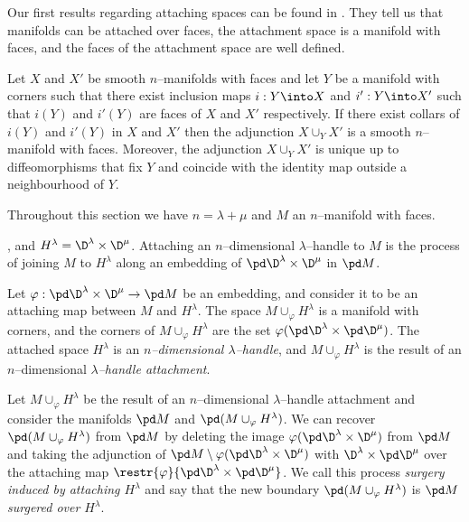 Our first results regarding attaching spaces can be found in \cite{JSP}.
They tell us that manifolds can be attached over faces, the attachment space is a manifold with faces, and the faces of the attachment space are well defined.

\begin{prop}
	Let $X$ and $X'$ be smooth $n$--manifolds with faces and let $Y$ be a manifold with corners such that there exist inclusion maps $i:Y\into X$ and $i':Y\into X'$ such that $i(Y)$ and $i'(Y)$ are faces of $X$ and $X'$ respectively.
	If there exist collars of $i(Y)$ and $i'(Y)$ in $X$ and $X'$ then the adjunction $X\cup_Y X'$ is a smooth $n$--manifold with faces.
	Moreover, the adjunction $X\cup_Y X'$ is unique up to diffeomorphisms that fix $Y$ and coincide with the identity map outside a neighbourhood of $Y$.
\end{prop}

Throughout this section we have $n=\lambda+\mu$ and $M$ an $n$--manifold with faces.




, and $H^\lambda=\D^\lambda\times\D^\mu$.
Attaching an $n$--dimensional $\lambda$--handle to $M$ is the process of joining $M$ to $H^\lambda$ along an embedding of $\pd\D^\lambda\times\D^\mu$ in $\pd M$. 

\begin{defn}[Handle]
	\label{def:handle}
	Let $\varphi:\pd\D^\lambda\times\D^\mu\to\pd M$ be an embedding, and consider it to be an attaching map between $M$ and $H^\lambda$.
	The space $M\cup_\varphi H^\lambda$ is a manifold with corners, and the corners of $M\cup_\varphi H^\lambda$ are the set $\varphi(\pd\D^\lambda\times\pd\D^\mu)$.
	The attached space $H^\lambda$ is an \emph{$n$--dimensional $\lambda$--handle}, and $M\cup_\varphi H^\lambda$ is the result of an $n$--dimensional \emph{$\lambda$--handle attachment}.
\end{defn}

\begin{defn}[Surgery]
	\label{def:surgery}
	Let $M\cup_\varphi H^\lambda$ be the result of an $n$--dimensional $\lambda$--handle attachment and consider the manifolds $\pd M$ and $\pd (M\cup_\varphi H^\lambda)$.
	We can recover $\pd (M\cup_\varphi H^\lambda)$ from $\pd M$ by deleting the image $\varphi(\pd\D^\lambda\times\D^\mu)$ from $\pd M$ and taking the adjunction of $\pd M\setminus \varphi(\pd\D^\lambda\times\D^\mu)$ with $\D^\lambda\times\pd\D^\mu$ over the attaching map $\restr{\varphi}{\pd\D^\lambda\times\pd\D^\mu}$.
	We call this process \emph{surgery induced by attaching $H^\lambda$} and say that the new boundary $\pd (M\cup_\varphi H^\lambda)$ is \emph{$\pd M$ surgered over $H^\lambda$}.
\end{defn}

